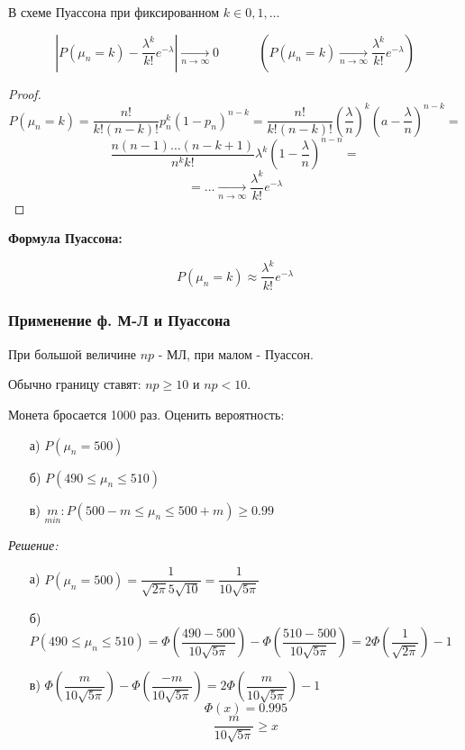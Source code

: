 \begin{definition}
	В схеме Пуассона при фиксированном $k \in 0,1, \dots$
	
	\[ \left| P(\mu_n = k) - \dfrac{\lambda^k}{k!}e^{-\lambda} \right| \underset{n \to \infty}{\to} 0 ~~~~~~~~~~~~~~ \left( P(\mu_n = k)\underset{n \to \infty}{\to} \dfrac{\lambda^k}{k!}e^{- \lambda} \right) \]
	
	\begin{proof}
		\[ P(\mu_n = k) = \dfrac{n!}{k!(n-k)!} p_n^k (1-p_n)^{n-k} = \dfrac{n!}{k!(n-k)!} \left( \dfrac{\lambda}{n} \right)^k \left( a - \dfrac{\lambda}{n} \right)^{n-k} = \]
		\[ \dfrac{n(n-1) \dots (n-k+1)}{n^k k!} \lambda^k \left( 1-\dfrac{\lambda}{n} \right)^{n-n} = \]
		\[ = \dots \underset{n \to \infty}{\to} \dfrac{\lambda^k}{k!}e^{-\lambda} \]
	\end{proof}

\end{definition}

\noindent\textbf{Формула Пуассона:}

\[ P(\mu_n = k) \approx \dfrac{\lambda^k}{k!}e^{-\lambda} \]

\subsubsection{Применение ф. М-Л и Пуассона}

При большой величине $np$ - МЛ, при малом - Пуассон.

Обычно границу ставят: $np \ge 10$ и $np < 10$.

\begin{exmp}
	Монета бросается 1000 раз. Оценить вероятность:
	\begin{enumerate}
		\item[а)] $P(\mu_n = 500)$
		\item[б)] $P(490 \le \mu_n \le 510)$
		\item[в)] $\underset{min}{m} : P(500-m \le \mu_n \le 500+m) \ge 0.99$
	\end{enumerate}

	\textit{Решение:}
	
	\begin{enumerate}
		\item[а)] $P(\mu_n = 500) = \dfrac{1}{\sqrt{2 \pi} 5 \sqrt{10}} = \dfrac{1}{10\sqrt{5 \pi}}$
		\item[б)] $P(490 \le \mu_n \le 510) = \Phi \left( \dfrac{490-500}{10\sqrt{5 \pi}} \right) - \Phi \left( \dfrac{510-500}{10\sqrt{5 \pi}} \right) = 2 \Phi \left( \dfrac{1}{\sqrt{2 \pi}} \right) - 1$
		\item[в)] $\Phi \left( \dfrac{m}{10 \sqrt{5 \pi}} \right) - \Phi \left( \dfrac{-m}{10 \sqrt{5 \pi}} \right) = 2\Phi \left( \dfrac{m}{10 \sqrt{5 \pi}} \right) - 1$
		\[ \Phi(x) = 0.995 \]
		\[ \dfrac{m}{10 \sqrt{5 \pi}} \ge x \]
	\end{enumerate}
\end{exmp}

